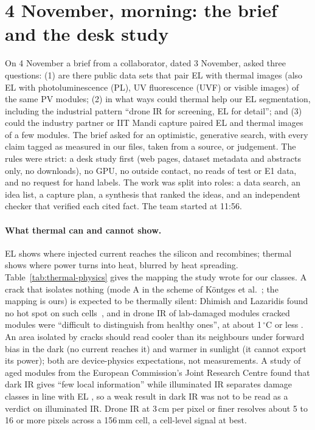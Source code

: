 \section{4 November, morning: the brief and the desk study}\label{sec:thermal-desk}

On 4 November a brief from a collaborator, dated 3 November, asked three questions: (1) are there public data sets that pair EL with thermal images (also
EL with photoluminescence (PL), UV fluorescence (UVF) or visible images) of the same PV modules; (2) in what ways could thermal help
our EL segmentation, including the industrial pattern ``drone IR for screening, EL for detail''; and (3) could the industry partner
or IIT Mandi capture paired EL and thermal images of a few modules. The brief asked for an optimistic, generative search, with every
claim tagged as measured in our files, taken from a source, or judgement. The rules were strict: a desk study first (web pages,
dataset metadata and abstracts only, no downloads), no GPU, no outside contact, no reads of test or E1 data, and no request for
hand labels. The work was split into roles: a data search, an idea list, a capture plan, a synthesis that ranked the ideas, and an
independent checker that verified each cited fact. The team started at 11:56.

\paragraph{What thermal can and cannot show.} EL shows where injected current reaches the silicon and recombines; thermal shows where
power turns into heat, blurred by heat spreading. Table~\ref{tab:thermal-physics} gives the mapping the study wrote for our classes.
A crack that isolates nothing (mode A in the scheme of K\"ontges et al.~\citep{kontges2011risk}; the mapping is ours) is expected to
be thermally silent: Dhimish and Lazaridis found no hot spot on such cells~\citep{dhimish2021hotspots}, and in drone IR of
lab-damaged modules cracked modules were ``difficult to distinguish from healthy ones'', at about 1\,$^{\circ}$C or less
\citep{delpradosantamaria2025drone}. An area isolated by cracks should read cooler than its neighbours under forward bias in the
dark (no current reaches it) and warmer in sunlight (it cannot export its power); both are device-physics expectations, not
measurements. A study of aged modules from the European Commission's Joint Research Centre found that dark IR gives ``few local
information'' while illuminated IR separates damage classes in line with EL \citep{berardone2017jrc},
so a weak result in dark IR was not to be read as a verdict on illuminated IR. Drone IR at 3\,cm per pixel or finer resolves about 5
to 16 or more pixels across a 156\,mm cell, a cell-level signal at best.

